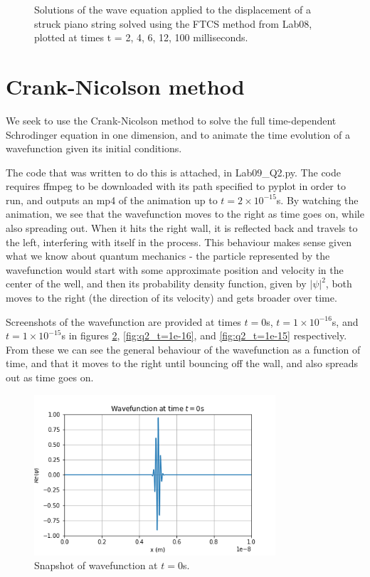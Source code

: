 \documentclass{article}
\begin{document}
\begin{figure}[H]
\begin{minipage}[b]{0.33\linewidth}
  	\end{minipage}	
 	\caption{Solutions of the wave equation applied to the displacement of a struck piano string solved using the FTCS method from Lab08, plotted at times t = 2, 4, 6, 12, 100 milliseconds.} 
\label{fig:wave_FTCS} 
\end{figure}


\section{Crank-Nicolson method}

We seek to use the Crank-Nicolson method to solve the full time-dependent Schrodinger equation in one dimension, and to animate the time evolution of a wavefunction given its initial conditions.

The code that was written to do this is attached, in Lab09\_Q2.py. The code requires ffmpeg to be downloaded with its path specified to pyplot in order to run, and outputs an mp4 of the animation up to $t=2\times 10^{-15}$s. By watching the animation, we see that the wavefunction moves to the right as time goes on, while also spreading out. When it hits the right wall, it is reflected back and travels to the left, interfering with itself in the process. This behaviour makes sense given what we know about quantum mechanics - the particle represented by the wavefunction would start with some approximate position and velocity in the center of the well, and then its probability density function, given by $|\psi|^2$, both moves to the right (the direction of its velocity) and gets broader over time.

Screenshots of the wavefunction are provided at times $t=0$s, $t=1\times 10^{-16}$s, and $t=1\times 10^{-15}$s in figures \ref{fig:q2_t=0}, \ref{fig:q2_t=1e-16}, and \ref{fig:q2_t=1e-15} respectively. From these we can see the general behaviour of the wavefunction as a function of time, and that it moves to the right until bouncing off the wall, and also spreads out as time goes on.

\begin{figure}[H]
	\centering
	\includegraphics[width=0.8\textwidth]{../images/q2_t=0.png}
	\caption{Snapshot of wavefunction at $t=0$s.}
	\label{fig:q2_t=0}
\end{figure}
\end{document}
